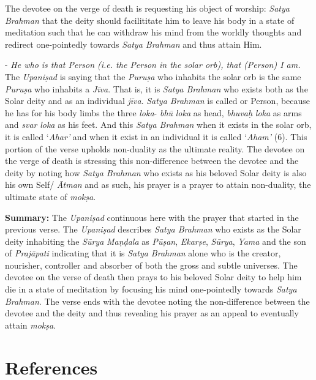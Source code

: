 The devotee on the verge of death is requesting his object of worship: \emph{Satya Brahman} that the deity should facilititate him to leave his body in a state of meditation such that he can withdraw his mind from the worldly thoughts and redirect one-pointedly towards \emph{Satya Brahman} and thus attain Him.

- \emph{He who is that Person (i.e. the Person in the solar orb), that (Person) I am.} The \emph{Upaniṣad} is saying that the \emph{Puruṣa} who inhabits the solar orb is the same \emph{Puruṣa} who inhabits a \emph{Jīva}. That is, it is \emph{Satya Brahman} who exists both as the Solar deity and as an individual \emph{jīva}. \emph{Satya Brahman} is called  or Person, because he has for his body limbs the three \emph{loka}- \emph{bhū} \emph{loka} as head, \emph{bhuvaḥ} \emph{loka} as arms and \emph{svar} \emph{loka} as his feet. And this \emph{Satya Brahman} when it exists in the solar orb, it is called `\emph{Ahar'} and when it exist in an individual it is called `\emph{Aham'} (6). This portion of the verse upholds non-duality as the ultimate reality. The devotee on the verge of death is stressing this non-difference between the devotee and the deity by noting how \emph{Satya Brahman} who exists as his beloved Solar deity is also his own Self/ \emph{Ātman} and as such, his prayer is a prayer to attain non-duality, the ultimate state of \emph{mokṣa}.

\textbf{Summary:} The \emph{Upaniṣad} continuous here with the prayer that started in the previous verse. The \emph{Upaniṣad} describes \emph{Satya Brahman} who exists as the Solar deity inhabiting the \emph{Sūrya} \emph{Maṇḍala} as \emph{Pūṣan}, \emph{Ekarṣe}, \emph{Sūrya}, \emph{Yama} and the son of \emph{Prajāpati} indicating that it is \emph{Satya Brahman} alone who is the creator, nourisher, controller and absorber of both the gross and subtle universes. The devotee on the verse of death then prays to his beloved Solar deity to help him die in a state of meditation by focusing his mind one-pointedly towards \emph{Satya Brahman}. The verse ends with the devotee noting the non-difference between the devotee and the deity and thus revealing his prayer as an appeal to eventually attain \emph{mokṣa}.

\section*{References}

